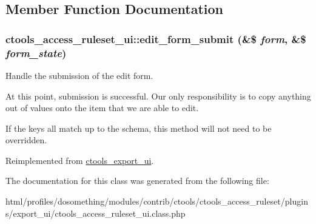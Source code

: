 \subsection{Member Function Documentation}
\hypertarget{classctools__access__ruleset__ui_a662643e9e29c9692d71783bc446ec1ee}{
\subsubsection[{edit\_\-form\_\-submit}]{\setlength{\rightskip}{0pt plus 5cm}ctools\_\-access\_\-ruleset\_\-ui::edit\_\-form\_\-submit (\&\$ {\em form}, \/  \&\$ {\em form\_\-state})}}
\label{classctools__access__ruleset__ui_a662643e9e29c9692d71783bc446ec1ee}
Handle the submission of the edit form.

At this point, submission is successful. Our only responsibility is to copy anything out of values onto the item that we are able to edit.

If the keys all match up to the schema, this method will not need to be overridden. 

Reimplemented from \hyperlink{classctools__export__ui_ad63b402977462073eade789265987139}{ctools\_\-export\_\-ui}.

The documentation for this class was generated from the following file:\begin{DoxyCompactItemize}
\item 
html/profiles/dosomething/modules/contrib/ctools/ctools\_\-access\_\-ruleset/plugins/export\_\-ui/ctools\_\-access\_\-ruleset\_\-ui.class.php\end{DoxyCompactItemize}

